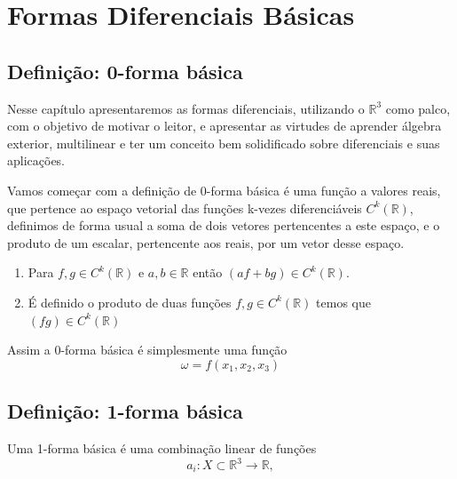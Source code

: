 \setcounter{page}{1}

\section{Formas Diferenciais Básicas}


\subsection{Definição: 0-forma básica}

\hspace{0.5cm}
Nesse capítulo apresentaremos as formas diferenciais, utilizando o 
$\mathbb{R}^3$ como palco, com o objetivo de motivar o leitor, e 
apresentar as virtudes de aprender álgebra exterior, multilinear e 
ter um conceito bem solidificado sobre diferenciais e suas aplicações.

Vamos começar com a definição de  0-forma básica é uma função a 
valores reais, que pertence ao espaço vetorial das funções 
k-vezes diferenciáveis $C^{k}(\mathbb{R})$, definimos de forma 
usual a soma de dois vetores pertencentes a este 
espaço, e o produto de um escalar, pertencente aos reais, 
por um vetor desse espaço.

\begin{enumerate}
	\item Para $f,g\in C^{k}(\mathbb{R})$ e $a,b \in \mathbb{R}$ 
	então $(af + bg)\in C^{k}(\mathbb{R})$.
	\item É definido o produto de duas funções $f,g \in C^{k}(\mathbb{R})$ temos que $(fg)\in C^{k}(\mathbb{R})$
\end{enumerate}

Assim a 0-forma básica é simplesmente uma função
%
\begin{equation}
\omega = f(x_1, x_2, x_3)    
\end{equation}


\subsection{Definição: 1-forma básica} 

\hspace{0.5cm}
Uma 1-forma básica é uma combinação linear de funções 
%
\begin{equation}
a_i: X \subset \mathbb{R}^3 \to \mathbb{R},
\end{equation}

